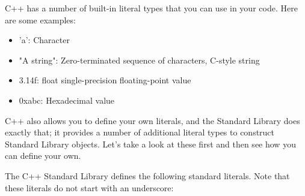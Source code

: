 
C++ has a number of built-in literal types that you can use in your code. Here are some examples:

\begin{itemize}
\item
'a': Character

\item
"A string": Zero-terminated sequence of characters, C-style string

\item
3.14f: float single-precision floating-point value

\item
0xabc: Hexadecimal value
\end{itemize}

C++ also allows you to define your own literals, and the Standard Library does exactly that; it provides a number of additional literal types to construct Standard Library objects. Let’s take a look at these first and then see how you can define your own.


The C++ Standard Library defines the following standard literals. Note that these literals do not start with an underscore:

